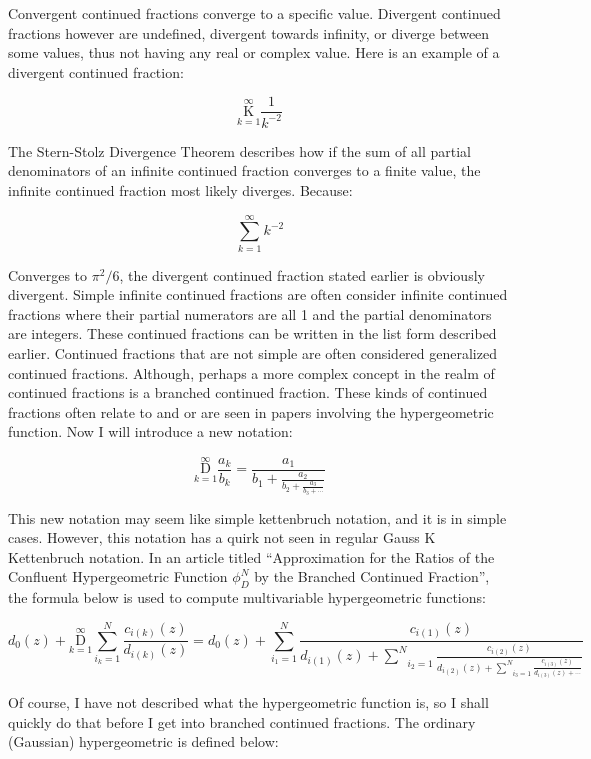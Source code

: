 \documentclass{article}
\begin{document}
Convergent continued fractions converge to a specific value. Divergent continued fractions however are undefined, divergent towards infinity, or diverge between some values, thus not having any real or complex value.
Here is an example of a divergent continued fraction:

$$\underset{k=1}{\overset{\infty}{ \mathrm K}} \frac{1}{k^{-2} }$$

The Stern-Stolz Divergence Theorem describes how if the sum of all partial denominators of an infinite continued fraction converges to a finite value, the infinite continued fraction most likely diverges. Because:

$$\underset{k=1}{\overset{\infty}{ \sum}} {k^{-2} }$$

Converges to $ \pi^2 / 6$, the divergent continued fraction stated earlier is obviously divergent. Simple infinite continued fractions are often consider infinite continued fractions where their partial numerators are all 1 and the partial denominators are integers. These continued fractions can be written in the list form described earlier. Continued fractions that are not simple are often considered generalized continued fractions. Although, perhaps a more complex concept in the realm of continued fractions is a branched continued fraction. These kinds of continued fractions often relate to and or are seen in papers involving the hypergeometric function. Now I will introduce a new notation:

$$\underset{k=1}{\overset{\infty}{ \mathrm D}} \frac{a_k}{b_k} = \frac{a_1}{b_1+\frac{a_2}{b_2+\frac{a_3}{b_3+\cdots}}}$$

This new notation may seem like simple kettenbruch notation, and it is in simple cases. However, this notation has a quirk not seen in regular Gauss K Kettenbruch notation. In an article titled “Approximation for the Ratios of the Confluent Hypergeometric Function $\phi_D^N$ by the Branched Continued Fraction”, the formula below is used to compute multivariable hypergeometric functions:

$$ d_0(z) + \underset{k=1}{\overset{\infty}{ \mathrm D}} \underset{i_k=1}{\overset{N}{ \sum}} \frac{c_{i(k)} (z)}{d_{i(k)} (z)} = d_0(z)  +\underset{i_1=1}{\overset{N}{ \sum}} \frac{c_{i(1)} (z)}{d_{i(1)} (z) + \underset{i_2=1}{\overset{N}{ \sum}} \frac{c_{i(2)} (z)}{d_{i(2)} (z) + \underset{i_3=1}{\overset{N}{ \sum}} \frac{c_{i(3)} (z)}{d_{i(3)} (z) + \cdots}}} $$


Of course, I have not described what the hypergeometric function is, so I shall quickly do that before I get into branched continued fractions. The ordinary (Gaussian) hypergeometric is defined below:
\end{document}
